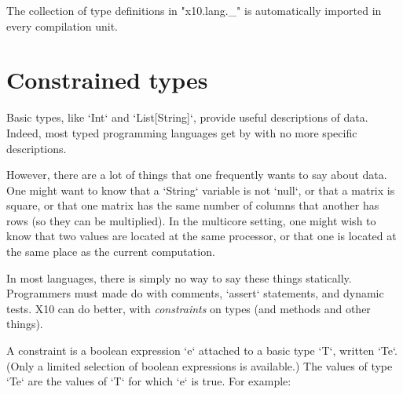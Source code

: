 The collection of type definitions in
\xcdmath"x10.lang._" is automatically imported in every compilation unit.
\label{X10LangUnderscore}







\section{Constrained types}
\label{ConstrainedTypes}
\label{DepType:DepType}
\label{DepTypes}



Basic types, like \xcd`Int` and \xcd`List[String]`, provide useful
descriptions of data.  Indeed, most typed programming languages get by with no
more specific descriptions.

However, there are a lot of things that one frequently wants to say about
data.  One might want to know that a \xcd`String` variable is not \xcd`null`,
or that a matrix is square, or that one matrix has the same number of columns
that another has rows (so they can be multiplied).  In the multicore setting,
one might wish to know that two values are located at the same processor, or
that one is located at the same place as the current computation.

In most languages, there is simply no way to say these things statically.
Programmers must made do with comments, \xcd`assert` statements, and dynamic
tests.  X10 can do better, with {\em constraints} on types (and methods and
other things).

A constraint is a boolean expression \xcd`e` attached to a basic type \xcd`T`,
written \xcd`T{e}`.  (Only a limited selection of boolean expressions is
available.)  The values of type \xcd`T{e}` are the values of \xcd`T` for which
\xcd`e` is true.  For example: 

